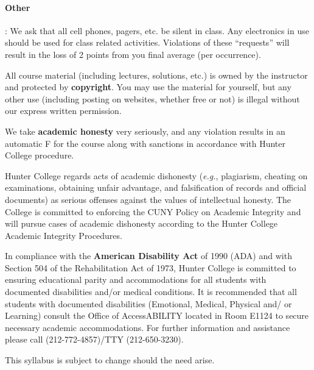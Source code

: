\documentclass[10pt]{article}
\def\eg {{\it e.g.}, }
\begin{document}
\paragraph*{\bf Other}:
We ask that all cell phones, pagers, etc. be silent in class. Any
electronics in use should be used for class related activities.
Violations of these ``requests'' will result in the loss of
2 points from you final average (per occurrence).

  All course material (including lectures, solutions, etc.) is owned
  by the instructor and protected by {\bf copyright}.
  You may use the material for yourself, but any other use (including
  posting on websites, whether free or not) is illegal without our
  express written permission.

  We take {\bf academic honesty} very seriously, and any violation
  results in  an automatic F for the course along with sanctions in
  accordance with Hunter College procedure. 

   Hunter College regards acts of academic dishonesty
  (\eg plagiarism, cheating on examinations, obtaining unfair
  advantage, and falsification of records and official documents) as
  serious offenses against the values of intellectual honesty.
  The College is committed to enforcing the CUNY Policy on Academic
  Integrity and will pursue cases of academic dishonesty according to
  the Hunter College Academic Integrity Procedures.

  In compliance with the {\bf American Disability Act}
  of 1990 (ADA) and with Section 504 of the Rehabilitation Act of
  1973, Hunter   College is committed to ensuring educational parity
  and accommodations for all students with documented disabilities
  and/or medical conditions.
  It is recommended that all students with documented disabilities
  (Emotional, Medical, Physical and/ or Learning) consult the Office
  of AccessABILITY located in Room E1124 to secure necessary academic
  accommodations.
  For further information and assistance please call
  (212-772-4857)/TTY (212-650-3230).



  This syllabus is subject to change should the need arise.
\end{document}
